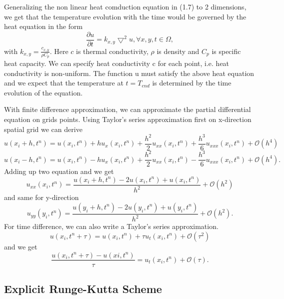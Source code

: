\documentclass[10pt,a4paper]{report}
\begin{document}
Generalizing the non linear heat comduction equation in (1.7) to 2 dimensions, we get that the temperature evolution with the time would be governed by the heat equation in the form 
\begin{equation}
{\frac{\partial u}{\partial t}}=k_{x,y}\bigtriangledown^2 u,\forall{x,y,t}\in \Omega,
\end{equation}
with $k_{x,y} = {\frac{c_{x,y}}{\rho C_p}}$. Here $c$ is thermal conductivity, $\rho$ is density and $C_p$ is specific heat capacity. 
We can specify heat conductivity c for each point, i.e. heat conductivity is non-uniform. The function u must satisfy the above heat equation and we expect that the temperature at $t=T_{end}$ is determined by the time evolution of the equation.

With finite difference approximation, we can approximate the partial differential equation on grids points. Using Taylor's series approximation first on x-direction spatial grid we can derive
\begin{equation}
u(x_i+h,t^n)=u(x_i,t^n)+hu_x(x_i,t^n)+{\frac{h^2}{2}}u_{xx}(x_i,t^n)+{\frac{h^3}{6}}u_{xxx}(x_i,t^n)+\mathcal{O}(h^4)
\end{equation}
\begin{equation}
u(x_i-h,t^n)=u(x_i,t^n)-hu_x(x_i,t^n)+{\frac{h^2}{2}}u_{xx}(x_i,t^n)-{\frac{h^3}{6}}u_{xxx}(x_i,t^n)+\mathcal{O}(h^4) .
\end{equation}
Adding up two equation and we get
\begin{equation}
u_{xx}(x_i,t^n)={\frac{u(x_i+h,t^n)-2u(x_i,t^n)+u(x_i,t^n)}{h^2}}+\mathcal{O}(h^2)
\end{equation}
and same for y-direction
\begin{equation}
u_{yy}(y_i,t^n)={\frac{u(y_i+h,t^n)-2u(y_i,t^n)+u(y_i,t^n)}{h^2}}+\mathcal{O}(h^2).
\end{equation}
For time difference, we can also write a Taylor's series approximation.
\begin{equation}
u(x_i,t^n+\tau)=u(x_i,t^n)+\tau u_t(x_i,t^n)+\mathcal{O}(\tau^2) 
\end{equation}
and we get\begin{equation}
{\frac{u(x_i,t^n+\tau)-u(xi,t^n)}{\tau}}=u_t(x_i,t^n)+\mathcal{O}(\tau).
\end{equation} %

\subsection{Explicit Runge-Kutta Scheme}
\end{document}
